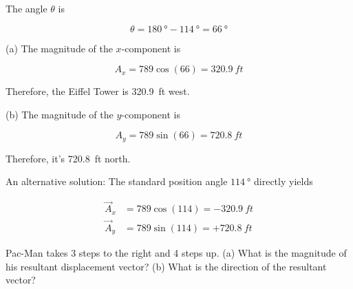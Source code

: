 \documentclass{article}
\begin{document}
\Solution

\begin{figure}[h!]
    \centering
{}
\end{figure}

The angle $\theta$ is

\begin{equation*}
    \theta = \SI{180}{\degree} - \SI{114}{\degree} = \SI{66}{\degree}
\end{equation*}

(a) The magnitude of the $x$-component is 

\begin{equation*}
    A_x = 789 \cos{(66)} = \SI{320.9}{ft}
\end{equation*}

Therefore, the Eiffel Tower is \SI{320.9}{ft} west.

(b) The magnitude of the $y$-component is

\begin{equation*}
    A_y = 789 \sin{(66)} = \SI{720.8}{ft}
\end{equation*}

Therefore, it's \SI{720.8}{ft} north.

An alternative solution: The standard position angle $\SI{114}{\degree}$ directly yields 

\begin{align*}
    \vec{A}_x &= 789 \cos{(114)} = -\SI{320.9}{ft}\\[1ex]
    \vec{A}_y &= 789 \sin{(114)} = +\SI{720.8}{ft}
\end{align*}

\begin{example}
    Pac-Man takes 3 steps to the right and 4 steps up. (a) What is the magnitude of his resultant displacement vector? (b) What is the direction of the resultant vector?
\end{example}
\end{document}
